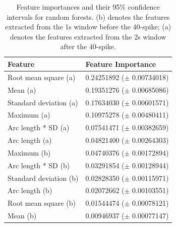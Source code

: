 
\begin{table}[t]
\centering
\begin{tabular}{@{}ll@{}}
\toprule
Feature                & Feature Importance \\ \midrule
Root mean square (a)   & 0.24251892 ($\pm$ 0.00734018)         \\
Mean (a)               & 0.19351276 ($\pm$ 0.00685086)         \\
Standard deviation (a) & 0.17634030 ($\pm$ 0.00601571)         \\
Maximum (a)            & 0.10975278 ($\pm$ 0.00480411)         \\
Arc length * SD (a)    & 0.07541471 ($\pm$ 0.00382659)         \\
Arc length (a)         & 0.04821400 ($\pm$ 0.00264303)         \\
Maximum (b)            & 0.04740376 ($\pm$ 0.00172894)         \\
Arc length * SD (b)    & 0.03291854 ($\pm$ 0.00128944)         \\
Standard deviation (b) & 0.02828350 ($\pm$ 0.00115971)         \\
Arc length (b)         & 0.02072662 ($\pm$ 0.00103551)         \\
Root mean square (b)   & 0.01544474 ($\pm$ 0.00078121)         \\
Mean (b)               & 0.00946937 ($\pm$ 0.00077147)          \\ \bottomrule
\end{tabular}
\caption{Feature importances and their 95\% confidence intervals for random forests. (b) denotes the features extracted from the 1s window before the 40-spike; (a) denotes the features extracted from the 2s window after the 40-spike.}
\label{tbl:importance-rf}
\end{table}




